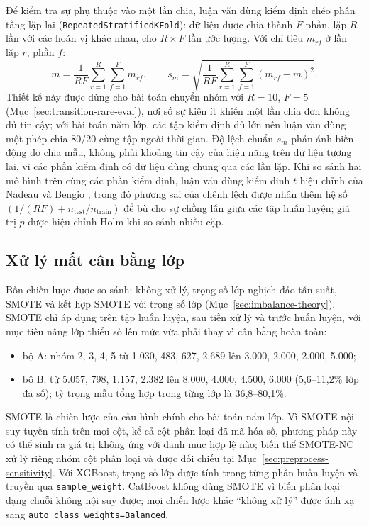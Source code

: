 Để kiểm tra sự phụ thuộc vào một lần chia, luận văn dùng kiểm định chéo phân tầng lặp lại (\mbox{\texttt{RepeatedStratifiedKFold}}): dữ liệu được chia thành $F$ phần, lặp $R$ lần với các hoán vị khác nhau, cho $R\times F$ lần ước lượng. Với chỉ tiêu $m_{rf}$ ở lần lặp $r$, phần $f$:
\[
\bar m=\frac{1}{RF}\sum_{r=1}^{R}\sum_{f=1}^{F}m_{rf},
\qquad
s_m=\sqrt{\frac{1}{RF}\sum_{r=1}^{R}\sum_{f=1}^{F}(m_{rf}-\bar m)^2}.
\]
Thiết kế này được dùng cho bài toán chuyển nhóm với $R=10$, $F=5$ (Mục~\ref{sec:transition-rare-eval}), nơi số sự kiện ít khiến một lần chia đơn không đủ tin cậy; với bài toán năm lớp, các tập kiểm định đủ lớn nên luận văn dùng một phép chia 80/20 cùng tập ngoài thời gian. Độ lệch chuẩn $s_m$ phản ánh biến động do chia mẫu, không phải khoảng tin cậy của hiệu năng trên dữ liệu tương lai, vì các phần kiểm định có dữ liệu dùng chung qua các lần lặp. Khi so sánh hai mô hình trên cùng các phần kiểm định, luận văn dùng kiểm định $t$ hiệu chỉnh của Nadeau và Bengio \cite{nadeau2003inference}, trong đó phương sai của chênh lệch được nhân thêm hệ số $(1/(RF)+n_{\mathrm{test}}/n_{\mathrm{train}})$ để bù cho sự chồng lấn giữa các tập huấn luyện; giá trị $p$ được hiệu chỉnh Holm khi so sánh nhiều cặp.

\subsection{Xử lý mất cân bằng lớp}
\label{sec:imbalance}

Bốn chiến lược được so sánh: không xử lý, trọng số lớp nghịch đảo tần suất, SMOTE và kết hợp SMOTE với trọng số lớp (Mục~\ref{sec:imbalance-theory}). SMOTE chỉ áp dụng trên tập huấn luyện, sau tiền xử lý và trước huấn luyện, với mục tiêu nâng lớp thiểu số lên mức vừa phải thay vì cân bằng hoàn toàn:
\begin{itemize}
    \item bộ A: nhóm 2, 3, 4, 5 từ 1.030, 483, 627, 2.689 lên 3.000, 2.000, 2.000, 5.000;
    \item bộ B: từ 5.057, 798, 1.157, 2.382 lên 8.000, 4.000, 4.500, 6.000 (5,6--11,2\% lớp đa số); tỷ trọng mẫu tổng hợp trong từng lớp là 36,8--80,1\%.
\end{itemize}
SMOTE là chiến lược của cấu hình chính cho bài toán năm lớp. Vì SMOTE nội suy tuyến tính trên mọi cột, kể cả cột phân loại đã mã hóa số, phương pháp này có thể sinh ra giá trị không ứng với danh mục hợp lệ nào; biến thể SMOTE-NC xử lý riêng nhóm cột phân loại và được đối chiếu tại Mục~\ref{sec:preprocess-sensitivity}. Với XGBoost, trọng số lớp được tính trong từng phần huấn luyện và truyền qua \texttt{sample\_weight}. CatBoost không dùng SMOTE vì biến phân loại dạng chuỗi không nội suy được; mọi chiến lược khác ``không xử lý'' được ánh xạ sang \mbox{\texttt{auto\_class\_weights=Balanced}}.

